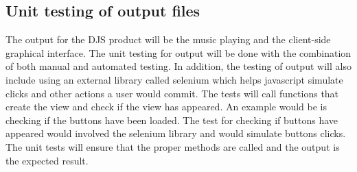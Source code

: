 \documentclass[12pt, titlepage]{article}
\begin{document}
\subsection{Unit testing of output files}
The output for the DJS product will be the music playing and the client-side graphical interface. The unit testing for output will be done with the combination of both manual and automated testing. In addition, the testing of output will also include using an external library called selenium which helps javascript simulate clicks and other actions a user would commit. The tests will call functions that create the view and check if the view has appeared. An example would be is checking if the buttons have been loaded. The test for checking if buttons have appeared would involved the selenium library and would simulate buttons clicks. The unit tests will ensure that the proper methods are called and the output is the expected result.




\newpage
\end{document}
